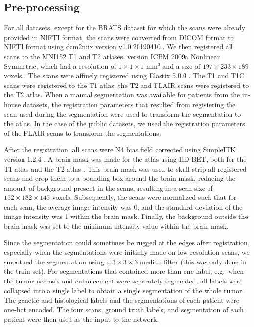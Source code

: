 \subsection{Pre-processing}
For all datasets, except for the \gls{BRATS} dataset for which the scans were already provided in \acrshort{NIFTI} format, the scans were converted from DICOM format to \acrshort{NIFTI} format using dcm2niix version v1.0.20190410 \autocite{li2016first}.
We then registered all scans to the MNI152 \gls{T1} and \gls{T2} atlases, version ICBM 2009a Nonlinear Symmetric, which had a resolution of $1\times1\times1$ mm$^3$ and a size of $197\times233\times189$ voxels \autocite{fonov2011unbiased, fonov2009unbiased}.
The scans were affinely registered using Elastix 5.0.0 \autocite{klein2010elastix, shamonin2014fast}.
The \gls{T1} and \gls{T1C} scans were registered to the \gls{T1} atlas; the \gls{T2} and \gls{FLAIR} scans were registered to the \gls{T2} atlas.
When a manual segmentation was available for patients from the in-house datasets, the registration parameters that resulted from registering the scan used during the segmentation were used to transform the segmentation to the atlas.
In the case of the public datasets, we used the registration parameters of the \gls{FLAIR} scans to transform the segmentations.

After the registration, all scans were N4 bias field corrected using SimpleITK version 1.2.4 \autocite{lowekamp2013simpleitk}.
A brain mask was made for the atlas using HD-BET, both for the \gls{T1} atlas and the \gls{T2} atlas \autocite{isensee2019hdbet}.
This brain mask was used to skull strip all registered scans and crop them to a bounding box around the brain mask, reducing the amount of background present in the scans, resulting in a scan size of $152\times182\times145$ voxels.
Subsequently, the scans were normalized such that for each scan, the average image intensity was 0, and the standard deviation of the image intensity was 1 within the brain mask.
Finally, the background outside the brain mask was set to the minimum intensity value within the brain mask.

Since the segmentation could sometimes be rugged at the edges after registration, especially when the segmentations were initially made on low-resolution scans, we smoothed the segmentation using a $3\times3\times3$ median filter (this was only done in the train set).
For segmentations that contained more than one label, e.g.\ when the \gls{tumor} necrosis and enhancement were separately segmented, all labels were collapsed into a single label to obtain a single segmentation of the whole \gls{tumor}.
The genetic and histological labels and the segmentations of each patient were one-hot encoded.
The four scans, ground truth labels, and segmentation of each patient were then used as the input to the network.


